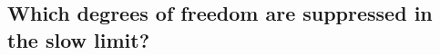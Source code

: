 \documentclass[a4paper, amsfonts, amssymb, amsmath, reprint, twocolumn, showkeys, nofootinbib]{revtex4-2}
\begin{document}


\subsection{Which degrees of freedom are suppressed in the slow limit?}\label{degmuiono}
\end{document}
